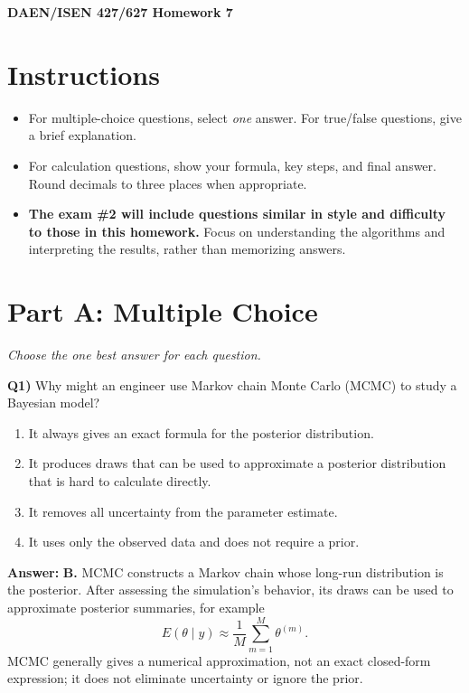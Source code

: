 \documentclass[12pt]{article}
\newenvironment{solution}{\par\smallskip\begingroup\color{blue}\noindent\textbf{Answer: }\smallskip}{\par\endgroup\medskip}
\newcommand{\question}[2]{\vspace{0.7em}\noindent\textbf{Q#1)}}
\begin{document}
\begin{center}
{\Large\bfseries DAEN/ISEN 427/627 Homework 7}
\par
\end{center}

\section*{Instructions}
\begin{itemize}[leftmargin=1.4em,nosep]
\item For multiple-choice questions, select \emph{one} answer. For true/false questions, give a brief explanation.
\item For calculation questions, show your formula, key steps, and final answer. Round decimals to three places when appropriate.
\item \textbf{The exam \#2 will include questions similar in style and difficulty to those in this homework.} Focus on understanding the algorithms and interpreting the results, rather than memorizing answers.
\end{itemize}

\section*{Part A: Multiple Choice}
\textit{Choose the one best answer for each question.}

\question{1}{}
Why might an engineer use Markov chain Monte Carlo (MCMC) to study a Bayesian model?
\begin{enumerate}[label=\Alph*.,nosep]
\item It always gives an exact formula for the posterior distribution.
\item It produces draws that can be used to approximate a posterior distribution that is hard to calculate directly.
\item It removes all uncertainty from the parameter estimate.
\item It uses only the observed data and does not require a prior.
\end{enumerate}

\begin{solution}
\textbf{B.} MCMC constructs a Markov chain whose long-run distribution is the posterior. After assessing the simulation's behavior, its draws can be used to approximate posterior summaries, for example
\[E(\theta\mid y)\approx \frac{1}{M}\sum_{m=1}^{M}\theta^{(m)}.\]
MCMC generally gives a numerical approximation, not an exact closed-form expression; it does not eliminate uncertainty or ignore the prior.
\end{solution}
\end{document}

